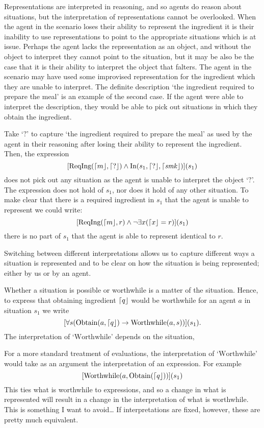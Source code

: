 \documentclass[10pt]{article}
\begin{document}
Representations are interpreted in reasoning, and so agents do reason about situations, but the interpretation of representations cannot be overlooked.
When the agent in the scenario loses their ability to represent the ingredient it is their inability to use representations to point to the appropriate situations which is at issue.
Perhaps the agent lacks the representation as an object, and without the object to interpret they cannot point to the situation, but it may be also be the case that it is their ability to interpret the object that falters.
The agent in the scenario may have used some improvised representation for the ingredient which they are unable to interpret.
The definite description `the ingredient required to prepare the meal' is an example of the second case.
If the agent were able to interpret the description, they would be able to pick out situations in which they obtain the ingredient.

Take `\(?\)' to capture `the ingredient required to prepare the meal' as used by the agent in their reasoning after losing their ability to represent the ingredient.
Then, the expression
\[
  [
  \text{ReqIng}(\mathord{\lceil{m}\rfloor},\mathord{\lceil{?}\rfloor})
  \land \text{In}(s_{1}, \mathord{\lceil{?}\rfloor},
  \mathord{\lceil{\text{\emph{smk}}}\rfloor})
  ]
  (s_{1})
\]
does not pick out any situation as the agent is unable to interpret the object `\(?\)'.
The expression does not hold of \(s_{1}\), nor does it hold of any other situation.
To make clear that there is a required ingredient in \(s_{1}\) that the agent is unable to represent we could write:
\[
  [
  \text{ReqIng}(\mathord{\lceil{m}\rfloor},r) \land \lnot\exists x(\mathord{\lceil{x}\rfloor} = r)
  ](s_{1})
\]
there is no part of \(s_{1}\) that the agent is able to represent identical to \(r\).

Switching between different interpretations allows us to capture different ways a situation is represented and to be clear on how the situation is being represented; either by us or by an agent.

Whether a situation is possible or worthwhile is a matter of the situation.
Hence, to express that obtaining ingredient \(\mathord{\lceil{q}\rfloor}\) would be worthwhile for an agent \(a\) in situation \(s_{1}\) we write
\[
  [
  \forall s(\text{Obtain}(a, \mathord{\lceil{q}\rfloor}) \rightarrow \text{Worthwhile}(a,s))
  ](s_{1})
  .
\]
The interpretation of `\(\text{Worthwhile}\)' depends on the situation,


For a more standard treatment of evaluations, the interpretation of `\(\text{Worthwhile}\)' would take as an argument the interpretation of an expression.
For example
\[
[\text{Worthwhile}(a, \text{Obtain}(\mathord{\lceil{q}\rfloor}))](s_{1})
\]
This ties what is worthwhile to expressions, and so a change in what is represented will result in a change in the interpretation of what is worthwhile.
This is something I want to avoid\dots
If interpretations are fixed, however, these are pretty much equivalent.
\end{document}
